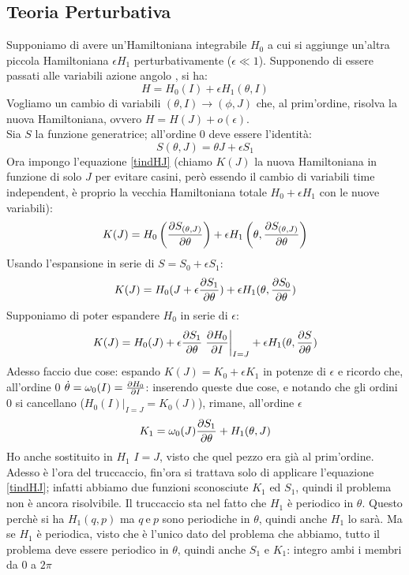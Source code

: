 \documentclass[a4paper,12pt]{article}
\renewcommand{\arg}[1]{_{(#1)}}
\theoremstyle{plain}
\theoremstyle{definition}
\newcommand{\econg}{~\text{e}~}
\theoremstyle{remark}
\begin{document}
\subsection{Teoria Perturbativa}
Supponiamo di avere un'Hamiltoniana integrabile $H_0$ a cui si aggiunge un'altra piccola Hamiltoniana $\epsilon H_1$ perturbativamente ($\epsilon\ll1$). Supponendo di essere passati alle variabili azione angolo , si ha:
\[H=H_0(I)+\epsilon H_1(\theta,I)		\]
Vogliamo un cambio di variabili $(\theta,I)\rightarrow(\phi,J)$ che, al prim'ordine, risolva la nuova Hamiltoniana, ovvero $H=H(J)+o(\epsilon)$.
\\ Sia $S$ la funzione generatrice; all'ordine $0$ deve essere l'identità:
\[S(\theta,J)=\theta J+\epsilon S_1\]
Ora impongo l'equazione \ref{tindHJ} (chiamo $K(J)$ la nuova Hamiltoniana in funzione di solo $J$ per evitare casini, però essendo il cambio di variabili time independent, è proprio la vecchia Hamiltoniana totale $H_0+\epsilon H_1$ con le nuove variabili):
\[K(J)=	H_0\left(\pdv{S\arg{\theta, J}}{\theta}\right)+\epsilon H_1\left(\theta,\pdv{S\arg{\theta, J}}{\theta}\right)		\]
Usando l'espansione in serie di $S=S_0+\epsilon S_1$:
\[K(J)=H_0(J+\epsilon \pdv{S_1}{\theta})+\epsilon H_1(\theta,\pdv{S_0}{\theta})\]
Supponiamo di poter espandere $H_0$ in serie di $\epsilon$:
\[K(J)=H_0(J)+\epsilon \pdv{S_1}{\theta} \left.\pdv{H_0}{I}\right|_{I=J}+\epsilon		 H_1(\theta,\pdv{S}{\theta})\]
Adesso faccio due cose: espando $K(J)=K_0+\epsilon K_1$ in potenze di $\epsilon$ e ricordo che, all'ordine 0 $\dot{\theta}=\omega_0(I)=\pdv{H_0}{I}$: inserendo queste due cose, e notando che gli ordini 0 si cancellano ($\left.H_0(I)\right|_{I=J}=K_0(J)$), rimane, all'ordine $\epsilon$
\[K_1=\omega_0(J)	\pdv{S_1}{\theta} +H_1(\theta,J)		\]
Ho anche sostituito in $H_1$ $I=J$, visto che quel pezzo era già al prim'ordine.
\\Adesso è l'ora del truccaccio, fin'ora si trattava solo di applicare l'equazione \ref{tindHJ}; infatti abbiamo due funzioni sconosciute $K_1$ ed $S_1$, quindi il problema non è ancora risolvibile. Il truccaccio sta nel fatto che $H_1$ è periodico in $\theta$. Questo perchè si ha $H_1(q,p)$ ma $q\econg p$ sono periodiche in $\theta$, quindi anche $H_1$ lo sarà. Ma se $H_1$ è periodica, visto che è l'unico dato del problema che abbiamo, tutto il problema deve essere periodico in $\theta$, quindi anche $S_1$ e $K_1$:
 integro ambi i membri da $0$ a $2\pi$
 
\end{document}

